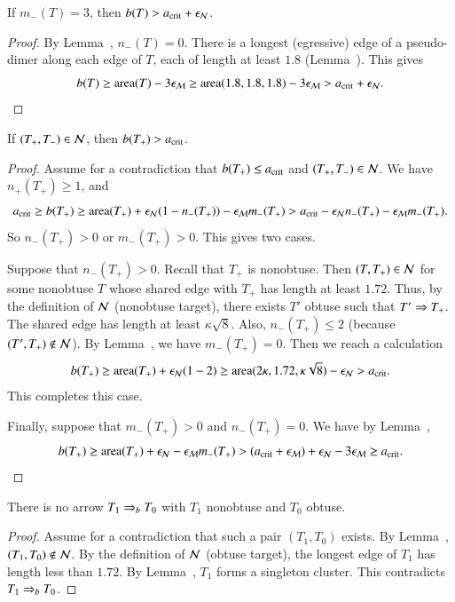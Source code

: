 \begin{lemma} 
If $m_-(T) = 3$, then $b(T) > a_\text{crit} + \epsilon_{\mathcal N}$.
\end{lemma}

\begin{proof} By Lemma~, $n_-(T)=0$.  There is a
  longest (egressive) edge of a pseudo-dimer along each edge of $T$,
  each of length at least $1.8$ (Lemma~).  This gives
\[
b(T) \ge {\operatorname{area}}(T) - 3\epsilon_{\mathcal M} 
\ge {\operatorname{area}}(1.8,1.8,1.8) - 3\epsilon_{\mathcal M} > a_\text{crit} + \epsilon_{\mathcal N}.
\]
\end{proof}

\begin{lemma}  
  If $(T_+,T_-)\in \mathcal N$, then $b(T_+)>a_\text{crit}$.
\end{lemma}

\begin{proof}  Assume for a contradiction that $b(T_+)\le a_\text{crit}$ and $(T_+,T_-)\in\mathcal N$. We have $n_+(T_+)\ge 1$, and
\[
a_\text{crit} \ge b(T_+) 
\ge {\operatorname{area}}(T_+) + \epsilon_{\mathcal N} (1 - n_-(T_+)) - \epsilon_{\mathcal M} m_-(T_+)
> a_\text{crit} - \epsilon_{\mathcal N} n_-(T_+) - \epsilon_{\mathcal M} m_-(T_+).
\]
So $n_-(T_+) > 0$ or $m_-(T_+)>0$. This gives two cases.  

Suppose that $n_-(T_+) >0$.  Recall that $T_+$ is nonobtuse.  Then
$(T,T_+)\in\mathcal N$ for some nonobtuse $T$ whose shared edge with $T_+$ has
length at least $1.72$.  Thus, by the definition of $\mathcal N$ (nonobtuse
target), there exists $T'$ obtuse such that $T'\Rightarrow T_+$.  The shared
edge has length at least $\kappa\sqrt8$.  Also, $n_-(T_+)\le 2$
(because $(T',T_+)\not\in \mathcal N$).  By Lemma~, we have
$m_-(T_+)=0$.  Then we reach a calculation
\[
b(T_+) \ge {\operatorname{area}}(T_+) + \epsilon_{\mathcal N} (1 - 2) 
\ge {\operatorname{area}} (2\kappa,1.72,\kappa\sqrt8) - \epsilon_{\mathcal N} > a_\text{crit}.
\]
This completes this case.

Finally, suppose that $m_-(T_+)>0$ and $n_-(T_+)=0$.  %
We have by Lemma~,
\[
b(T_+) \ge {\operatorname{area}}(T_+)+\epsilon_{\mathcal N} - \epsilon_{\mathcal M} m_-(T_+) 
> (a_\text{crit} + \epsilon_{\mathcal M}) + \epsilon_{\mathcal N} -3\epsilon_{\mathcal M}  \ge a_\text{crit}.
\]
\end{proof}

\begin{lemma} 
  There is no arrow $T_1 \Rightarrow_{b} T_0$ with $T_1$ nonobtuse and $T_0$
  obtuse.
\end{lemma}

\begin{proof}  
  Assume for a contradiction that such a pair $(T_1,T_0)$ exists.  By
  Lemma~, $(T_1,T_0)\not\in\mathcal N$.  By the definition of
  $\mathcal N$ (obtuse target), the longest edge of $T_1$ has length less than
  $1.72$.  By Lemma~, $T_1$ forms a singleton
  cluster.  This contradicts $T_1\Rightarrow_{b} T_0$.
\end{proof}

